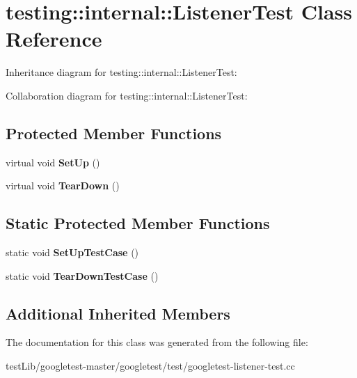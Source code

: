 \hypertarget{classtesting_1_1internal_1_1ListenerTest}{}\section{testing\+:\+:internal\+:\+:Listener\+Test Class Reference}
\label{classtesting_1_1internal_1_1ListenerTest}


Inheritance diagram for testing\+:\+:internal\+:\+:Listener\+Test\+:


Collaboration diagram for testing\+:\+:internal\+:\+:Listener\+Test\+:
\subsection*{Protected Member Functions}
\begin{DoxyCompactItemize}
\item 
\mbox{\label{classtesting_1_1internal_1_1ListenerTest_ace3dbe36b705ddf320518e6cdd919bc8}} 
virtual void {\bfseries Set\+Up} ()
\item 
\mbox{\label{classtesting_1_1internal_1_1ListenerTest_ad112535025d668e3ea14e71d8741c810}} 
virtual void {\bfseries Tear\+Down} ()
\end{DoxyCompactItemize}
\subsection*{Static Protected Member Functions}
\begin{DoxyCompactItemize}
\item 
\mbox{\label{classtesting_1_1internal_1_1ListenerTest_a7cbc298576e584b4021d0375204b7391}} 
static void {\bfseries Set\+Up\+Test\+Case} ()
\item 
\mbox{\label{classtesting_1_1internal_1_1ListenerTest_aa35b5f1c6235f0fe98aa2c7f35bb8fe1}} 
static void {\bfseries Tear\+Down\+Test\+Case} ()
\end{DoxyCompactItemize}
\subsection*{Additional Inherited Members}


The documentation for this class was generated from the following file\+:\begin{DoxyCompactItemize}
\item 
test\+Lib/googletest-\/master/googletest/test/googletest-\/listener-\/test.\+cc\end{DoxyCompactItemize}
